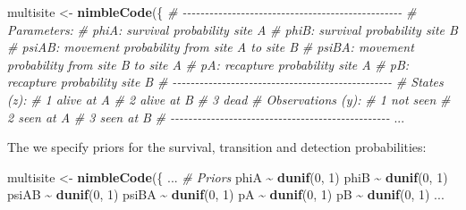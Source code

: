 \documentclass[
  12pt,
]{krantz}
\newenvironment{Shaded}{\begin{snugshade}}{\end{snugshade}}
\newcommand{\CommentTok}[1]{\textcolor[rgb]{0.56,0.35,0.01}{\textit{#1}}}
\newcommand{\DecValTok}[1]{\textcolor[rgb]{0.00,0.00,0.81}{#1}}
\newcommand{\FunctionTok}[1]{\textcolor[rgb]{0.13,0.29,0.53}{\textbf{#1}}}
\newcommand{\NormalTok}[1]{#1}
\newcommand{\OtherTok}[1]{\textcolor[rgb]{0.56,0.35,0.01}{#1}}
\newcommand{\SpecialCharTok}[1]{\textcolor[rgb]{0.81,0.36,0.00}{\textbf{#1}}}
\begin{document}
\begin{Shaded}
\begin{Highlighting}[]
\NormalTok{multisite }\OtherTok{\textless{}{-}} \FunctionTok{nimbleCode}\NormalTok{(\{}
  \CommentTok{\# {-}{-}{-}{-}{-}{-}{-}{-}{-}{-}{-}{-}{-}{-}{-}{-}{-}{-}{-}{-}{-}{-}{-}{-}{-}{-}{-}{-}{-}{-}{-}{-}{-}{-}{-}{-}{-}{-}{-}{-}{-}{-}{-}{-}{-}{-}{-}{-}{-}}
  \CommentTok{\# Parameters:}
  \CommentTok{\# phiA: survival probability site A}
  \CommentTok{\# phiB: survival probability site B}
  \CommentTok{\# psiAB: movement probability from site A to site B}
  \CommentTok{\# psiBA: movement probability from site B to site A}
  \CommentTok{\# pA: recapture probability site A}
  \CommentTok{\# pB: recapture probability site B}
  \CommentTok{\# {-}{-}{-}{-}{-}{-}{-}{-}{-}{-}{-}{-}{-}{-}{-}{-}{-}{-}{-}{-}{-}{-}{-}{-}{-}{-}{-}{-}{-}{-}{-}{-}{-}{-}{-}{-}{-}{-}{-}{-}{-}{-}{-}{-}{-}{-}{-}{-}{-}}
  \CommentTok{\# States (z):}
  \CommentTok{\# 1 alive at A}
  \CommentTok{\# 2 alive at B}
  \CommentTok{\# 3 dead}
  \CommentTok{\# Observations (y):}
  \CommentTok{\# 1 not seen}
  \CommentTok{\# 2 seen at A}
  \CommentTok{\# 3 seen at B}
  \CommentTok{\# {-}{-}{-}{-}{-}{-}{-}{-}{-}{-}{-}{-}{-}{-}{-}{-}{-}{-}{-}{-}{-}{-}{-}{-}{-}{-}{-}{-}{-}{-}{-}{-}{-}{-}{-}{-}{-}{-}{-}{-}{-}{-}{-}{-}{-}{-}{-}{-}{-}}
\NormalTok{...}
\end{Highlighting}
\end{Shaded}

The we specify priors for the survival, transition and detection probabilities:

\begin{Shaded}
\begin{Highlighting}[]
\NormalTok{multisite }\OtherTok{\textless{}{-}} \FunctionTok{nimbleCode}\NormalTok{(\{}
\NormalTok{...}
  \CommentTok{\# Priors}
\NormalTok{  phiA }\SpecialCharTok{\textasciitilde{}} \FunctionTok{dunif}\NormalTok{(}\DecValTok{0}\NormalTok{, }\DecValTok{1}\NormalTok{)}
\NormalTok{  phiB }\SpecialCharTok{\textasciitilde{}} \FunctionTok{dunif}\NormalTok{(}\DecValTok{0}\NormalTok{, }\DecValTok{1}\NormalTok{)}
\NormalTok{  psiAB }\SpecialCharTok{\textasciitilde{}} \FunctionTok{dunif}\NormalTok{(}\DecValTok{0}\NormalTok{, }\DecValTok{1}\NormalTok{)}
\NormalTok{  psiBA }\SpecialCharTok{\textasciitilde{}} \FunctionTok{dunif}\NormalTok{(}\DecValTok{0}\NormalTok{, }\DecValTok{1}\NormalTok{)}
\NormalTok{  pA }\SpecialCharTok{\textasciitilde{}} \FunctionTok{dunif}\NormalTok{(}\DecValTok{0}\NormalTok{, }\DecValTok{1}\NormalTok{)}
\NormalTok{  pB }\SpecialCharTok{\textasciitilde{}} \FunctionTok{dunif}\NormalTok{(}\DecValTok{0}\NormalTok{, }\DecValTok{1}\NormalTok{)}
\NormalTok{...}
\end{Highlighting}
\end{Shaded}
\end{document}
